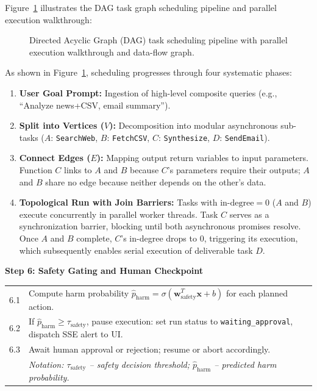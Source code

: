 \documentclass[12pt,a4paper]{report}
\begin{document}
\vspace{8pt}
Figure~\ref{fig:dag_scheduling_walkthrough} illustrates the DAG task graph scheduling pipeline and parallel execution walkthrough:

\begin{figure}[H]
    \centering
    \caption{Directed Acyclic Graph (DAG) task scheduling pipeline with parallel execution walkthrough and data-flow graph.}
    \label{fig:dag_scheduling_walkthrough}
\end{figure}

As shown in Figure~\ref{fig:dag_scheduling_walkthrough}, scheduling progresses through four systematic phases:
\begin{enumerate}
    \item \textbf{User Goal Prompt:} Ingestion of high-level composite queries (e.g., ``Analyze news+CSV, email summary'').
    \item \textbf{Split into Vertices ($V$):} Decomposition into modular asynchronous sub-tasks ($A$: \texttt{SearchWeb}, $B$: \texttt{FetchCSV}, $C$: \texttt{Synthesize}, $D$: \texttt{SendEmail}).
    \item \textbf{Connect Edges ($E$):} Mapping output return variables to input parameters. Function $C$ links to $A$ and $B$ because $C$'s parameters require their outputs; $A$ and $B$ share no edge because neither depends on the other's data.
    \item \textbf{Topological Run with Join Barriers:} Tasks with $\text{in-degree} = 0$ ($A$ and $B$) execute concurrently in parallel worker threads. Task $C$ serves as a synchronization barrier, blocking until both asynchronous promises resolve. Once $A$ and $B$ complete, $C$'s in-degree drops to 0, triggering its execution, which subsequently enables serial execution of deliverable task $D$.
\end{enumerate}

\vspace{8pt}
\noindent\textbf{Step 6: Safety Gating and Human Checkpoint}
\vspace{4pt}

\noindent\begin{tabular}{p{1cm} p{12.5cm}}
6.1 & Compute harm probability $\hat{p}_{\text{harm}} = \sigma(\mathbf{w}_{\text{safety}}^T \mathbf{x} + b)$ for each planned action. \\
6.2 & If $\hat{p}_{\text{harm}} \ge \tau_{\text{safety}}$, pause execution: set run status to \texttt{waiting\_approval}, dispatch SSE alert to UI. \\
6.3 & Await human approval or rejection; resume or abort accordingly. \\
 & \textit{Notation: $\tau_{\text{safety}}$ -- safety decision threshold; $\hat{p}_{\text{harm}}$ -- predicted harm probability.} \\
\end{tabular}
\end{document}
